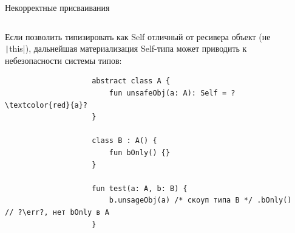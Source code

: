 \documentclass[handout,aspectratio=169,usenames,dvipsnames]{beamer}
\newcommand{\err}[0]{\textcolor{red}{ошибка}}
\begin{document}
    \begin{frame}[fragile]{Некорректные присваивания}
        \begin{columns}[onlytextwidth]
            \begin{column}{0.99\textwidth}
                Если позволить типизировать как Self отличный от ресивера объект (не \texttt|this|), дальнейшая материализация Self-типа может приводить к небезопасности системы типов:

                \begin{verbatim}
                    abstract class A {
                        fun unsafeObj(a: A): Self = ?\textcolor{red}{a}?
                    }

                    class B : A() {
                        fun bOnly() {}
                    }

                    fun test(a: A, b: B) {
                        b.unsageObj(a) /* скоуп типа B */ .bOnly() // ?\err?, нет bOnly в A
                    }
                \end{verbatim}
            \end{column}\hfill%
            \begin{column}{0.0\textwidth}
            \end{column}
        \end{columns}
    \end{frame}
\end{document}
